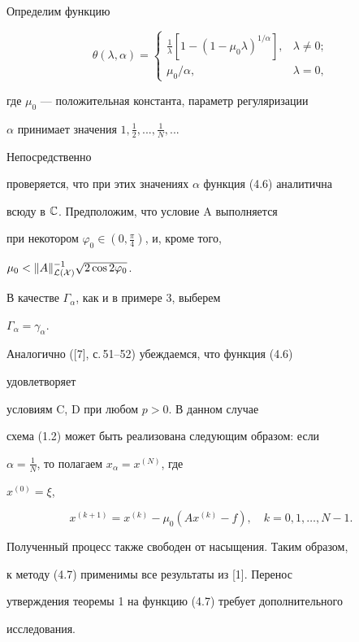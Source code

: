 \begin{exam}


Определим функцию 


\begin{equation}


\theta(\lambda,\alpha)=


\begin{cases}


\frac{1}{\lambda}[1-(1-\mu_0\lambda)^{1/\alpha}], &\lambda\ne0;\\


\mu_0/\alpha, & \lambda=0,


\end{cases}


\end{equation}


где $\mu_0$ --- положительная константа, параметр регуляризации


$\alpha$ принимает значения $1,\frac{1}{2},...,\frac{1}{N},...$ 




Непосредственно 


проверяется, что при этих значениях $\alpha$ функция (4.6) аналитична 


всюду в $\Bbb C$. Предположим, что условие A выполняется 


при некотором $\varphi_0\in(0,\frac{\pi}{4})$, и, кроме того, 


$\mu_0<\|A\|^{-1}_{\cal L(X)}\sqrt{2\cos2\varphi_0}$.


В качестве $\Gamma_\alpha$, как и в примере 3, выберем 


$\Gamma_\alpha=\gamma_\alpha$.


Аналогично ([7], с.\,51--52) убеждаемся, что функция (4.6) 


удовлетворяет 


условиям C, D при любом $p>0$. В данном случае 


схема (1.2) может быть реализована следующим образом: если 


$\alpha=\frac{1}{N}$, то полагаем $x_\alpha=x^{(N)}$, где 


$x^{(0)}=\xi$,


\begin{equation}


x^{(k+1)}=x^{(k)}-\mu_0(A x^{(k)}-f),\quad


k=0,1,\dotsc,N-1.


\end{equation}


Полученный процесс также свободен от насыщения. Таким образом, 


к методу (4.7) применимы все результаты из [1]. Перенос


утверждения теоремы 1 на функцию (4.7) требует дополнительного 


исследования.


\end{exam}





